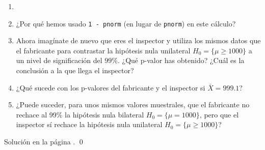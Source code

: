 \documentclass[10pt,a4paper]{article}\usepackage[]{graphicx}\usepackage[]{color}
\newcounter {cont01}
\begin{document}
\begin{ejercicio}
\label{tut07:ejercicio07}
\begin{enumerate}
  \item[]
  \item ¿Por qué hemos usado {\tt 1 - pnorm} (en lugar de {\tt pnorm}) en este cálculo?

  \item Ahora imagínate de nuevo que eres el inspector y utiliza los mismos datos que el fabricante para contrastar la hipótesis nula unilateral $H_0=\{\mu \geq 1000\}$ a un nivel de significación del $99\%$. ¿Qué p-valor has obtenido? ¿Cuál es la conclusión a la que llega el inspector?



  \item ¿Qué sucede con los p-valores del fabricante y el inspector si $\bar X = 999.1$?



  \item ¿Puede suceder, para unos mismos valores muestrales, que el fabricante no rechace al 99\% la hipótesis nula bilateral $H_0=\{\mu = 1000\}$, pero que el inspector sí rechace la hipótesis nula unilateral $H_0=\{\mu \geq 1000\}$?

\end{enumerate}
Solución en la página \pageref{tut07:ejercicio07:sol}.
\qed
\end{ejercicio}
\end{document}
